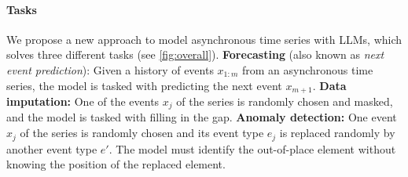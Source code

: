 

\vspace{-0.1in}
\paragraph{Tasks} We propose a new approach to model asynchronous time series with LLMs, which solves three different tasks (see \autoref{fig:overall}).
\textbf{Forecasting} (also known as \textit{next event prediction}): Given a history of events $x_{1:m}$ from an asynchronous time series, the model is tasked with predicting the next event $x_{m+1}$.
\textbf{Data imputation:} One of the events $x_j$ of the series is randomly chosen and masked, and the model is tasked with filling in the gap.
\textbf{Anomaly detection:} One event $x_j$ of the series is randomly chosen and its event type $e_j$ is replaced randomly by another event type $e'$. The model must identify the out-of-place element without knowing the position of the replaced element.


